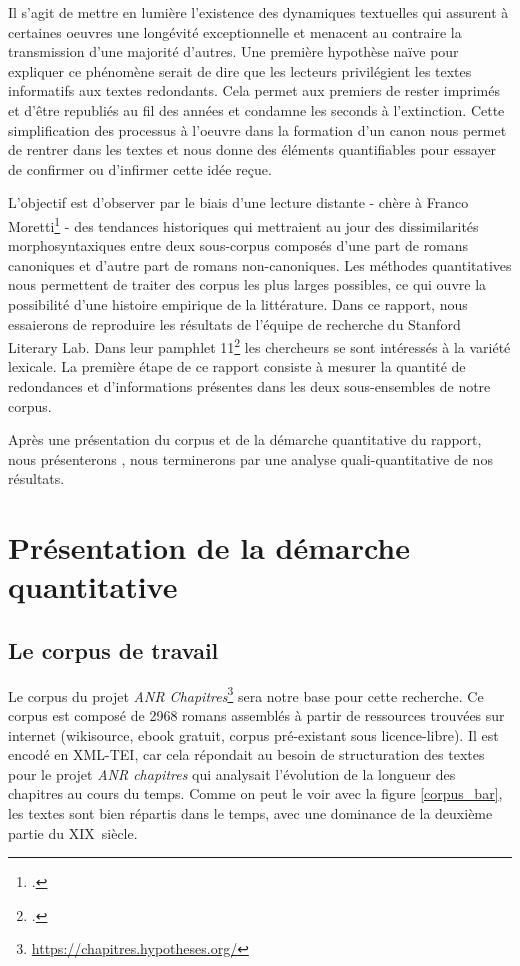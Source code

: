 \documentclass[a4paper,twoside,12pt]{book}
\begin{document}
Il s'agit de mettre en lumière l'existence des dynamiques textuelles qui assurent à certaines oeuvres une longévité exceptionnelle et menacent au contraire la transmission d'une majorité d'autres. Une première hypothèse naïve pour expliquer ce phénomène serait de dire que les lecteurs privilégient les textes informatifs aux textes redondants. Cela permet aux premiers de rester imprimés et d'être republiés au fil des années et condamne les seconds à l'extinction. Cette simplification des processus à l'oeuvre dans la formation d'un canon nous permet de rentrer dans les textes et nous donne des éléments quantifiables pour essayer de confirmer ou d'infirmer cette idée reçue. 

L'objectif est d'observer par le biais d'une lecture distante - chère à Franco Moretti\footcites{moretti_graphs_2005} - des tendances historiques qui mettraient au jour des dissimilarités morphosyntaxiques entre deux sous-corpus composés d'une part de romans \og canoniques\fg{} et d'autre part de romans \og non-canoniques\fg. Les méthodes quantitatives nous permettent de traiter des corpus les plus larges possibles, ce qui ouvre la possibilité d'une histoire empirique de la littérature. Dans ce rapport, nous essaierons de reproduire les résultats de l'équipe de recherche du Stanford Literary Lab. Dans leur pamphlet 11\footcites{mark_algee-hewitt_canonarchive_2016} les chercheurs se sont intéressés à la variété lexicale. La première étape de ce rapport consiste à mesurer la quantité de redondances et d'informations présentes dans les deux sous-ensembles de notre corpus.

Après une présentation du corpus et de la démarche quantitative du rapport, nous présenterons , nous terminerons par une analyse quali-quantitative de nos résultats. 


\chapter{Présentation de la démarche quantitative}

\section{Le corpus de travail}
Le corpus du projet \textit{ANR Chapitres}\footnote{\url{https://chapitres.hypotheses.org/}} sera notre base pour cette recherche. Ce corpus est composé de 2968 romans assemblés à partir de ressources trouvées sur internet (wikisource, ebook gratuit, corpus pré-existant sous licence-libre). Il est encodé en XML-TEI, car cela répondait au besoin de structuration des textes pour le projet \textit{ANR chapitres} qui analysait l'évolution de la longueur des chapitres au cours du temps. Comme on peut le voir avec la figure \ref{corpus_bar}, les textes sont bien répartis dans le temps, avec une dominance de la deuxième partie du XIX\ieme ~siècle. 
\end{document}
